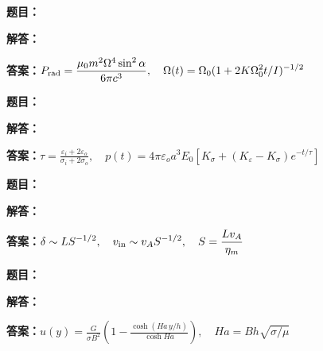 \documentclass[lang=cn,color=blue,11pt]{elegantbook}
\begin{document}
\noindent\textbf{题目：}
\par\noindent\textbf{解答：}
\par\noindent\textbf{答案：}\(\displaystyle P_{\rm rad}=\frac{\mu_0 m^2\Omega^4\sin^2\alpha}{6\pi c^3},\quad \Omega(t)=\Omega_0(1+2K\Omega_0^2t/I)^{-1/2}\)\par
\par\smallskip\noindent\hrulefill\par\medskip
{}\par
\noindent\textbf{题目：}
\par\noindent\textbf{解答：}
\par\noindent\textbf{答案：}\(\displaystyle \tau=\frac{\varepsilon_i+2\varepsilon_o}{\sigma_i+2\sigma_o},\quad p(t)=4\pi\varepsilon_o a^3 E_0[K_\sigma+(K_\varepsilon-K_\sigma)e^{-t/\tau}]\)\par
\par\smallskip\noindent\hrulefill\par\medskip
{}\par
\noindent\textbf{题目：}
\par\noindent\textbf{解答：}
\par\noindent\textbf{答案：}\(\displaystyle \delta\sim L S^{-1/2},\quad v_{\rm in}\sim v_A S^{-1/2},\quad S=\frac{Lv_A}{\eta_m}\)\par
\par\smallskip\noindent\hrulefill\par\medskip
{}\par
\noindent\textbf{题目：}
\par\noindent\textbf{解答：}
\par\noindent\textbf{答案：}\(\displaystyle u(y)=\frac{G}{\sigma B^2}\left(1-\frac{\cosh(Ha\,y/h)}{\cosh Ha}\right),\quad Ha=Bh\sqrt{\sigma/\mu}\)\par
\par\smallskip\noindent\hrulefill\par\medskip
\end{document}
